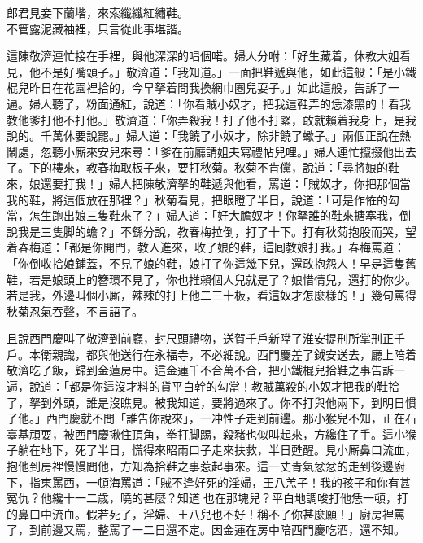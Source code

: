 \begin{myquote}
郎君見妾下蘭堦，來索纖纖紅繡鞋。\\不管露泥藏袖裡，只言從此事堪諧。
\end{myquote}

這陳敬濟連忙接在手裡，與他深深的唱個喏。{}婦人分咐：「好生藏着，休教大姐看見，{}他不是好嘴頭子。」敬濟道：「我知道。」一面把鞋遞與他，如此這般：「是小鐵棍兒昨日在花園裡拾的，今早拏着問我換網巾圈兒耍子。」如此這般，告訴了一遍。婦人聽了，粉面通紅，說道：「你看賊小奴才，把我這鞋弄的恁漆黑的！看我教他爹打他不打他。」敬濟道：「你弄殺我！打了他不打緊，敢就賴着我身上，是我說的。千萬休要說罷。」婦人道：「我饒了小奴才，除非饒了蠍子。」兩個正說在熱鬧處，忽聽小厮來安兒來尋：「爹在前廳請姐夫寫禮帖兒哩。」婦人連忙攛掇他出去了。下的樓來，教春梅取板子來，要打秋菊。秋菊不肯儻，說道：「尋將娘的鞋來，娘還要打我！」婦人把陳敬濟拏的鞋遞與他看，罵道：「賊奴才，你把那個當我的鞋，將這個放在那裡？」秋菊看見，把眼瞪了半日，說道：「可是作恠的勾當，怎生跑出娘三隻鞋來了？」婦人道：「好大膽奴才！你拏誰的鞋來搪塞我，倒說我是三隻脚的蟾？」不繇分說，教春梅拉倒，打了十下。打有秋菊抱股而哭，望着春梅道：「都是你開門，教人進來，收了娘的鞋，這囘教娘打我。」{}春梅罵道：「你倒收拾娘鋪蓋，不見了娘的鞋，娘打了你這幾下兒，還敢抱怨人！早是這隻舊鞋，若是娘頭上的簪環不見了，你也推賴個人兒就是了？{}娘惜情兒，還打的你少。若是我，外邊叫個小厮，辣辣的打上他二三十板，看這奴才怎麼樣的！」幾句罵得秋菊忍氣吞聲，不言語了。

且說西門慶叫了敬濟到前廳，封尺頭禮物，送賀千戶新陞了淮安提刑所掌刑正千戶。本衛親識，都與他送行在永福寺，不必細說。西門慶差了鉞安送去，廳上陪着敬濟吃了飯，歸到金蓮房中。這金蓮千不合萬不合，把小鐵棍兒拾鞋之事告訴一遍，說道：「都是你這沒才料的貨平白幹的勾當！教賊萬殺的小奴才把我的鞋拾了，拏到外頭，誰是沒瞧見。被我知道，要將過來了。你不打與他兩下，到明日慣了他。」西門慶就不問「誰告你說來」，一冲性子走到前邊。那小猴兒不知，正在石臺基頑耍，被西門慶揪住頂角，拳打脚踢，殺豬也似叫起來，方纔住了手。這小猴子躺在地下，死了半日，慌得來昭兩口子走來扶救，半日甦醒。見小厮鼻口流血，抱他到房裡慢慢問他，方知為拾鞋之事惹起事來。這一丈青氣忿忿的走到後邊廚下，指東罵西，一頓海罵道：「賊不逢好死的淫婦，王八羔子！我的孩子和你有甚冤仇？他纔十一二歲，曉的甚麼？知道𣭈也在那塊兒？平白地調唆打他恁一頓，打的鼻口中流血。假若死了，淫婦、王八兒也不好！稱不了你甚麼願！」廚房裡罵了，到前邊又罵，整罵了一二日還不定。因金蓮在房中陪西門慶吃酒，還不知。

